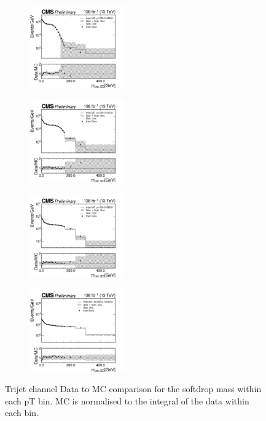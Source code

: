 \begin{figure}[h!]
  \centering
  \begin{subfigure}
    \centering
    \includegraphics[width=0.45\textwidth]{figures/multijet/trijet/trijet_msd_200_290.png}
  \end{subfigure}
  \begin{subfigure}
    \centering
    \includegraphics[width=0.45\textwidth]{figures/multijet/trijet/trijet_msd_290_400.png}
  \end{subfigure}
  \begin{subfigure}
    \centering
    \includegraphics[width=0.45\textwidth]{figures/multijet/trijet/trijet_msd_400_680.png}
  \end{subfigure}
  \begin{subfigure}
    \centering
    \includegraphics[width=0.45\textwidth]{figures/multijet/trijet/trijet_msd_680_13000.png}
  \end{subfigure}
  \caption{Trijet channel  Data to MC comparison for the softdrop mass within each pT bin. MC is normalised to the integral of the data within each \pt bin.}
  \label{fig:20}
\end{figure}


